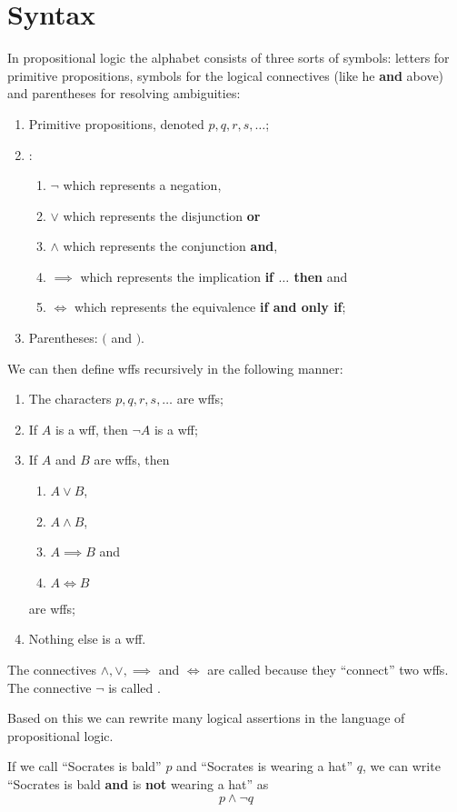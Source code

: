 \section{Syntax}
In propositional logic the alphabet consists of three sorts of symbols: letters for primitive propositions, symbols for the logical connectives (like he \textbf{and} above) and parentheses for resolving ambiguities:
\begin{enumerate}
\item Primitive propositions, denoted $p,q,r,s, \ldots$;
\item {}:
\begin{enumerate}
\item $\neg$ which represents a negation,
\item $\lor$ which represents the disjunction \textbf{or}
\item $\land$ which represents the conjunction \textbf{and},
\item $\implies$ which represents the implication \textbf{if $\ldots$ then} and
\item $\iff$ which represents the equivalence \textbf{if and only if};
\end{enumerate}
\item Parentheses: $($ and $)$.
\end{enumerate}
We can then define wffs recursively in the following manner:
\begin{enumerate}
\item The characters $p,q,r,s, \ldots$ are wffs;
\item If $A$ is a wff, then $\neg A$ is a wff;
\item If $A$ and $B$ are wffs, then
\begin{enumerate}
\item $A \lor B$,
\item $A \land B$,
\item $A \implies B$ and
\item $A \iff B$
\end{enumerate}
are wffs;
\item Nothing else is a wff.
\end{enumerate}

The connectives $\land, \lor, \implies$ and $\iff$ are called  because they ``connect'' two wffs. The connective $\neg$ is called .

Based on this we can rewrite many logical assertions in the language of propositional logic.
\begin{example}
If we call ``Socrates is bald'' $p$ and ``Socrates is wearing a hat'' $q$, we can write ``Socrates is bald \textbf{and} is \textbf{not} wearing a hat'' as 
\[p \land \neg q\]
\end{example}

